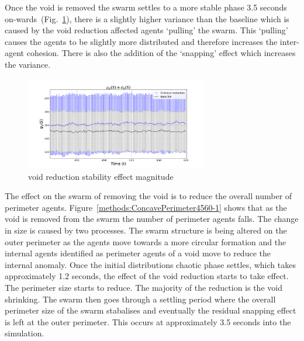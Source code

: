 \documentclass[preprint,12pt]{elsarticle}
\begin{document}
Once the void is removed the swarm settles to a more stable phase 3.5 seconds on-wards~(Fig.~\ref{voids:ConcavePerimeter4560-MAG-2}), there is a slightly higher variance than the baseline which is caused by the void reduction affected agents `pulling' the swarm. This `pulling' causes the agents to be slightly more distributed and therefore increases the inter-agent cohesion. There is also the addition of the `snapping' effect which increases the variance. 
\begin{figure}
\begin{center}
\includegraphics[width=8cm]{figures/ConcavePerimeter4560-MAG-2}
\end{center}
\caption{void reduction stability effect magnitude\label{voids:ConcavePerimeter4560-MAG-2}}
\end{figure}
The effect on the swarm of removing the void is to reduce the overall number of perimeter agents. Figure~\ref{methods:ConcavePerimeter4560-1} shows that as the void is removed from the swarm the number of perimeter agents falls. The change in size is caused by two processes. The swarm structure is being altered on the outer perimeter as the agents move towards a more circular formation and the internal agents identified as perimeter agents of a void move to reduce the internal anomaly. 
Once the initial distributions chaotic phase settles, which takes approximately 1.2 seconds, the effect of the void reduction starts to take effect. The perimeter size starts to reduce. The majority of the reduction is the void shrinking. The swarm then goes through a settling period where the overall perimeter size of the swarm stabalises and eventually the residual snapping effect is left at the outer perimeter. This occurs at approximately 3.5 seconds into the simulation. 
\end{document}
